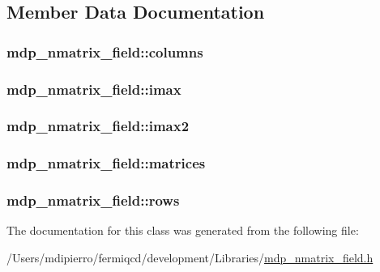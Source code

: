 \subsection{Member Data Documentation}
\hypertarget{classmdp__nmatrix__field_aaa3de1fa235579a53d5b4a3bc1ef504e}{
\subsubsection[{columns}]{ {\bf mdp\_\-nmatrix\_\-field::columns}}}
\label{classmdp__nmatrix__field_aaa3de1fa235579a53d5b4a3bc1ef504e}
\hypertarget{classmdp__nmatrix__field_a3f49b21188df1a14427384d3501b8926}{
\subsubsection[{imax}]{ {\bf mdp\_\-nmatrix\_\-field::imax}}}
\label{classmdp__nmatrix__field_a3f49b21188df1a14427384d3501b8926}
\hypertarget{classmdp__nmatrix__field_acc8ab22ea97de1a94f6e3abe818cbafa}{
\subsubsection[{imax2}]{ {\bf mdp\_\-nmatrix\_\-field::imax2}}}
\label{classmdp__nmatrix__field_acc8ab22ea97de1a94f6e3abe818cbafa}
\hypertarget{classmdp__nmatrix__field_a7ace5d4385ddb2f67a8f1c5e65fbf22e}{
\subsubsection[{matrices}]{ {\bf mdp\_\-nmatrix\_\-field::matrices}}}
\label{classmdp__nmatrix__field_a7ace5d4385ddb2f67a8f1c5e65fbf22e}
\hypertarget{classmdp__nmatrix__field_a6166f4d394efa361e3fa9552506c7c36}{
\subsubsection[{rows}]{ {\bf mdp\_\-nmatrix\_\-field::rows}}}
\label{classmdp__nmatrix__field_a6166f4d394efa361e3fa9552506c7c36}


The documentation for this class was generated from the following file:\begin{DoxyCompactItemize}
\item 
/Users/mdipierro/fermiqcd/development/Libraries/\hyperlink{mdp__nmatrix__field_8h}{mdp\_\-nmatrix\_\-field.h}\end{DoxyCompactItemize}
